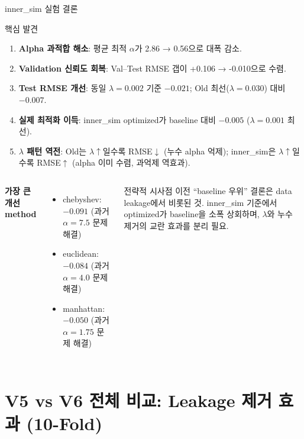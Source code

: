 \documentclass[aspectratio=169,10pt]{beamer}
\begin{document}
\begin{frame}{inner\_sim 실험 결론}
	\begin{block}{핵심 발견}
		\begin{enumerate}
			\item \textbf{Alpha 과적합 해소}: 평균 최적 $\alpha$가 2.86 → 0.56으로 대폭 감소.
			\item \textbf{Validation 신뢰도 회복}: Val–Test RMSE 갭이 +0.106 → -0.010으로 수렴.
			\item \textbf{Test RMSE 개선}: 동일 $\lambda=0.002$ 기준 $-0.021$; Old 최선($\lambda=0.030$) 대비 $-0.007$.
			\item \textbf{실제 최적화 이득}: inner\_sim optimized가 baseline 대비 $-0.005$ ($\lambda=0.001$ 최선).
			\item \textbf{$\lambda$ 패턴 역전}: Old는 $\lambda\uparrow$일수록 RMSE$\downarrow$ (누수 alpha 억제); inner\_sim은 $\lambda\uparrow$일수록 RMSE$\uparrow$ (alpha 이미 수렴, 과억제 역효과).
		\end{enumerate}
	\end{block}

	\vspace{0.4em}
	\begin{columns}[T]
			\textbf{가장 큰 개선 method}
			\begin{itemize}
				\item chebyshev: $-0.091$ (과거 $\alpha=7.5$ 문제 해결)
				\item euclidean: $-0.084$ (과거 $\alpha=4.0$ 문제 해결)
				\item manhattan: $-0.050$ (과거 $\alpha=1.75$ 문제 해결)
			\end{itemize}

			\begin{alertblock}{전략적 시사점}
				이전 ``baseline 우위'' 결론은 data leakage에서 비롯된 것.
				inner\_sim 기준에서 optimized가 baseline을 소폭 상회하며,
				$\lambda$와 누수 제거의 교란 효과를 분리 필요.
			\end{alertblock}
	\end{columns}
\end{frame}

\section{V5 vs V6 전체 비교: Leakage 제거 효과 (10-Fold)}
\end{document}
